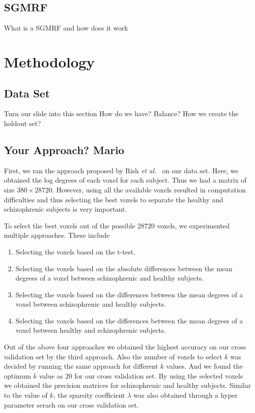 \documentclass{article} %
\begin{document}
\subsection{SGMRF}
What is a SGMRF and how does it work


\section{Methodology}

\subsection{Data Set}
Turn our slide into this section
How do we have? Balance? 
How we create the holdout set?


\subsection{Your Approach? Mario}
First, we ran the approach proposed by Rish \emph{et al.}~\cite{Rish_2013} on our data set. Here, we obtained the log degrees of each voxel for each subject. Thus we had a matrix of size  $380 \times 28720$. However, using all the available voxels resulted in computation difficulties and thus selecting the best voxels to separate the healthy and schizophrenic subjects is very important. 

To select the best voxels out of the possible $28720$ voxels, we experimented multiple approaches. These include \begin{enumerate}
  \item Selecting the voxels based on the t-test.
  \item Selecting the voxels based on the absolute differences between the mean degrees of a voxel between schizophrenic and healthy subjects.
  \item Selecting the voxels based on the differences between the mean degrees of a voxel between schizophrenic and healthy subjects.
  \item Selecting the voxels based on the differences between the mean degrees of a voxel between healthy and schizophrenic subjects.
\end{enumerate}
Out of the above four approaches we obtained the highest accuracy on our cross validation set by the third approach. Also the number of voxels to select $k$ was decided by running the same approach for different $k$ values. And we found the optimum $k$ value as $20$ for our cross validation set. By using the selected voxels we obtained the precision matrices for schizophrenic and healthy subjects. Similar to the value of $k$, the sparsity coefficient $\lambda$ was also obtained through a hyper parameter serach on our cross validation set.
\end{document}
